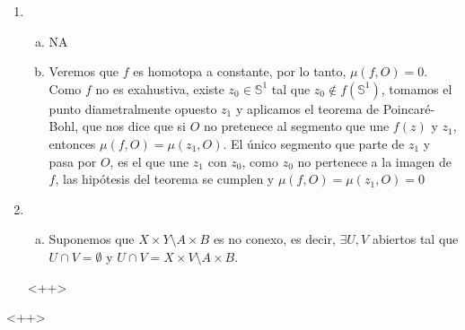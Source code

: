 \documentclass[a4paper]{article}
\begin{document}
\begin{enumerate}[(1)]
    \item
        \begin{enumerate}[a)]
            \item NA
            \item
                Veremos que $f$ es homotopa a constante, por lo tanto, $\mu(f, O) = 0$.
                Como $f$ no es exahustiva, existe $z_0 \in \mathbb{S}^1$ tal que
                $z_0 \notin f\left( \mathbb{S}^1 \right)$, tomamos el punto diametralmente opuesto $z_1$
                y aplicamos el teorema de Poincaré-Bohl, que nos dice que si $O$ no pretenece al segmento que 
                une $f(z)$ y $z_1$, entonces $\mu(f, O) = \mu(z_1, O)$. El único segmento que parte de $z_1$ y
                pasa por $O$, es el que une $z_1$ con $z_0$, como $z_0$ no pertenece a la imagen de $f$, las
                hipótesis del teorema se cumplen y $\mu(f, O) = \mu(z_1, O) = 0$
        \end{enumerate}
    \item
        \begin{enumerate}[a)]
            \item 
                Suponemos que $X \times Y \setminus A \times B$ es no conexo, es decir, $\exists U, V$ abiertos
                tal que $U \cap V = \emptyset$ y $U \cap V = X \times V \setminus A \times B$.
        \end{enumerate}<++>
\end{enumerate}<++>
\end{document}

